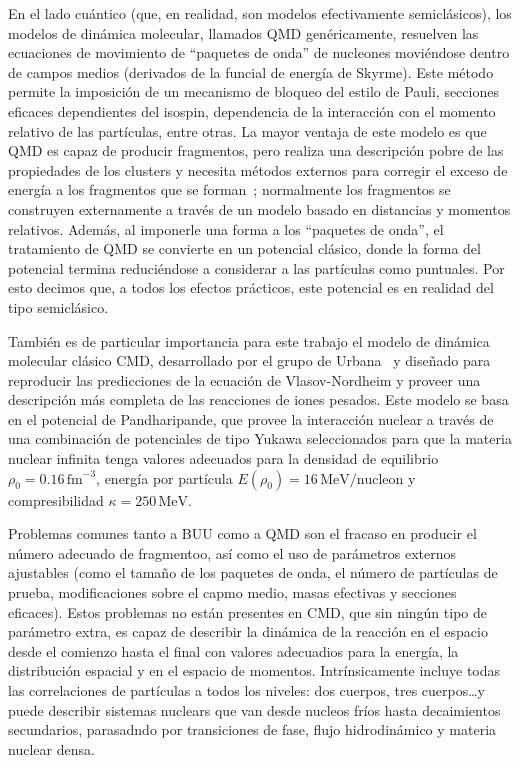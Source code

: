 En el lado cuántico (que, en realidad, son modelos efectivamente semiclásicos), los modelos de dinámica molecular, llamados QMD genéricamente, resuelven las ecuaciones de movimiento de ``paquetes de onda'' de nucleones moviéndose dentro de campos medios (derivados de la funcial de energía de Skyrme).
Este método permite la imposición de un mecanismo de bloqueo del estilo de Pauli, secciones eficaces dependientes del isospin, dependencia de la interacción con el momento relativo de las partículas, entre otras.
La mayor ventaja de este modelo es que QMD es capaz de producir fragmentos, pero realiza una descripción pobre de las propiedades de los clusters y necesita métodos externos para corregir el exceso de energía a los fragmentos que se forman~\cite{polanski_development_2005};
normalmente los fragmentos se construyen externamente a través de un modelo basado en distancias y momentos relativos.
Además, al imponerle una forma a los ``paquetes de onda'', el tratamiento de QMD se convierte en un potencial clásico, donde la forma del potencial termina reduciéndose a considerar a las partículas como puntuales.
Por esto decimos que, a todos los efectos prácticos, este potencial es en realidad del tipo semiclásico.

También es de particular importancia para este trabajo el modelo de dinámica molecular clásico CMD, desarrollado por el grupo de Urbana~\cite{lenk_accuracy_1990} y diseñado para reproducir las predicciones de la ecuación de Vlasov-Nordheim y proveer una descripción más completa de las reacciones de iones pesados.
Este modelo se basa en el potencial de Pandharipande, que provee la interacción nuclear a través de una combinación de potenciales de tipo Yukawa seleccionados para que la materia nuclear infinita tenga valores adecuados para la densidad de equilibrio $\rho_0 = 0.16\,\text{fm}^{-3}$, energía por partícula $E(\rho_0) = 16\,\text{MeV/nucleon}$ y compresibilidad $\kappa = 250\,\text{MeV}$.

Problemas comunes tanto a BUU como a QMD son el fracaso en producir el número adecuado de fragmentoo, así como el uso de parámetros externos ajustables (como el tamaño de los paquetes de onda, el número de partículas de prueba, modificaciones sobre el capmo medio, masas efectivas y secciones eficaces).
Estos problemas no están presentes en CMD, que sin ningún tipo de parámetro extra, es capaz de describir la dinámica de la reacción en el espacio desde el comienzo hasta el final con valores adecuadios para la energía, la distribución espacial y en el espacio de momentos.
Intrínsicamente incluye todas las correlaciones de partículas a todos los niveles: dos cuerpos, tres cuerpos\ldots y puede describir sistemas nuclears que van desde nucleos fríos hasta decaimientos secundarios, parasadndo por transiciones de fase, flujo hidrodinámico y materia nuclear densa.

